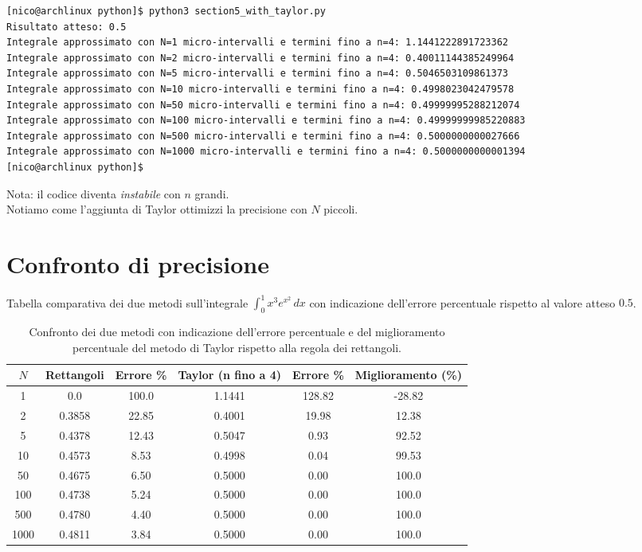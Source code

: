 \documentclass[10pt]{extarticle}
\begin{document}
\begin{lstlisting}[language=bash]
[nico@archlinux python]$ python3 section5_with_taylor.py
Risultato atteso: 0.5
Integrale approssimato con N=1 micro-intervalli e termini fino a n=4: 1.1441222891723362
Integrale approssimato con N=2 micro-intervalli e termini fino a n=4: 0.40011144385249964
Integrale approssimato con N=5 micro-intervalli e termini fino a n=4: 0.5046503109861373
Integrale approssimato con N=10 micro-intervalli e termini fino a n=4: 0.4998023042479578
Integrale approssimato con N=50 micro-intervalli e termini fino a n=4: 0.49999995288212074
Integrale approssimato con N=100 micro-intervalli e termini fino a n=4: 0.49999999985220883
Integrale approssimato con N=500 micro-intervalli e termini fino a n=4: 0.5000000000027666
Integrale approssimato con N=1000 micro-intervalli e termini fino a n=4: 0.5000000000001394
[nico@archlinux python]$
\end{lstlisting}
Nota: il codice diventa \textsl{instabile} con $n$ grandi. \\
Notiamo come l'aggiunta di Taylor ottimizzi la precisione con $N$ piccoli. 
\section{Confronto di precisione}
Tabella comparativa dei due metodi sull'integrale 
\(\int_0^1 x^3 e^{x^2} \, dx\) con indicazione dell'errore percentuale rispetto al valore atteso \(0.5\).

\begin{table}[h!]
\centering
\begin{tabular}{c|c|c|c|c|c}
$N$ & Rettangoli & Errore \% & Taylor (n fino a 4) & Errore \% & Miglioramento (\%) \\
\hline
1    & 0.0                  & 100.0      & 1.1441   & 128.82 & -28.82 \\
2    & 0.3858               & 22.85      & 0.4001   & 19.98  & 12.38 \\
5    & 0.4378               & 12.43      & 0.5047   & 0.93   & 92.52 \\
10   & 0.4573               & 8.53       & 0.4998   & 0.04   & 99.53 \\
50   & 0.4675               & 6.50       & 0.5000   & 0.00   & 100.0 \\
100  & 0.4738               & 5.24       & 0.5000   & 0.00   & 100.0 \\
500  & 0.4780               & 4.40       & 0.5000   & 0.00   & 100.0 \\
1000 & 0.4811               & 3.84       & 0.5000   & 0.00   & 100.0 \\
\end{tabular}
\caption{Confronto dei due metodi con indicazione dell'errore percentuale e del miglioramento percentuale del metodo di Taylor rispetto alla regola dei rettangoli.}
\end{table}
\end{document}
